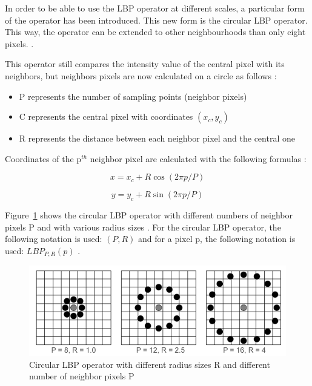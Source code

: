 \vspace{\baselineskip}
\noindent In order to be able to use the LBP operator at different scales, a particular form of the operator has been introduced. This new form is the circular LBP operator. This way, the operator can be extended to other neighbourhoods than only eight pixels. \cite{GAN08}.
\newline

\noindent This operator still compares the intensity value of the central pixel with its neighbors, but neighbors pixels are now calculated on a circle as follows \cite{GAN08}:

\begin{itemize}
  \item P represents the number of sampling points (neighbor pixels)
  \item C represents the central pixel with coordinates $ (x_c,y_c) $
  \item R represents the distance between each neighbor pixel and the central one
\end{itemize}

\noindent Coordinates of the p$^{th}$ neighbor pixel are calculated with the following formulas \cite{JUL07}:
\newline

\begin{equation}
   x = x_c + R\cos(2\pi p/P)
\end{equation}

\begin{equation}
   y = y_c + R\sin(2\pi p/P)
\end{equation}

\vspace{\baselineskip}
\noindent Figure~\ref{lbp_circular_operator} shows the circular LBP operator with different numbers of neighbor pixels P and with various radius sizes \cite{JUL07}. For the circular LBP operator, the following notation is used: $ (P,R) $ and for a pixel p, the following notation is used: $ LBP_{P,R}(p) $ \cite{GAN08}.

\begin{figure}[!h]
\begin{center}
\noindent \includegraphics[scale=0.5]{figures/lbp_circular_operator} 
\newline
\caption{Circular LBP operator with different radius sizes R and different number of neighbor pixels P}
\label{lbp_circular_operator}
\end{center} 
\end{figure}

